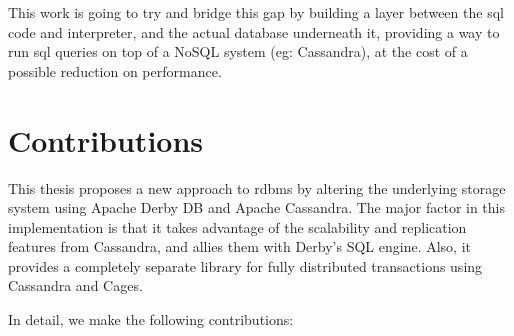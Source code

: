 This work is going to try and bridge this gap by building a layer between the \ac{sql} code and interpreter, and the actual database underneath it, providing a way to run \ac{sql} queries on top of a NoSQL system (eg: Cassandra), at the cost of a possible reduction on performance.



%




\section{Contributions}

This thesis proposes a new approach to \ac{rdbms} by altering the underlying storage system using Apache Derby DB and Apache Cassandra.
The major factor in this implementation is that it takes advantage of the scalability and replication features from Cassandra, and allies them with Derby's SQL engine. Also, it provides a completely separate library for fully distributed transactions using Cassandra and Cages. 

In detail, we make the following contributions:

